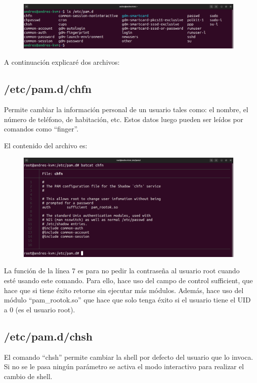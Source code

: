 \documentclass{article}
\begin{document}
\begin{figure}[H]
    \includegraphics[width=\textwidth]{imagenes/lspam.png}
\end{figure}

A continuación explicaré dos archivos:

\subsection*{/etc/pam.d/chfn}
Permite cambiar la información personal de un usuario tales como: el nombre, el número de teléfono, de habitación, etc. Estos datos luego pueden ser leídos por comandos como ``finger''.

El contenido del archivo es:

\begin{figure}[H]
    \includegraphics[width=\textwidth]{imagenes/pamchfn.png}
\end{figure}

La función de la línea 7 es para no pedir la contraseña al usuario root cuando esté usando este comando. Para ello, hace uso del campo de control sufficient, que hace que si tiene éxito retorne sin ejecutar más módulos. Además, hace uso del módulo ``pam\_rootok.so'' que hace que solo tenga éxito si el usuario tiene el UID a 0 (es el usuario root).

\subsection*{/etc/pam.d/chsh}
El comando ``chsh'' permite cambiar la shell por defecto del usuario que lo invoca. Si no se le pasa ningún parámetro se activa el modo interactivo para realizar el cambio de shell.
\end{document}
